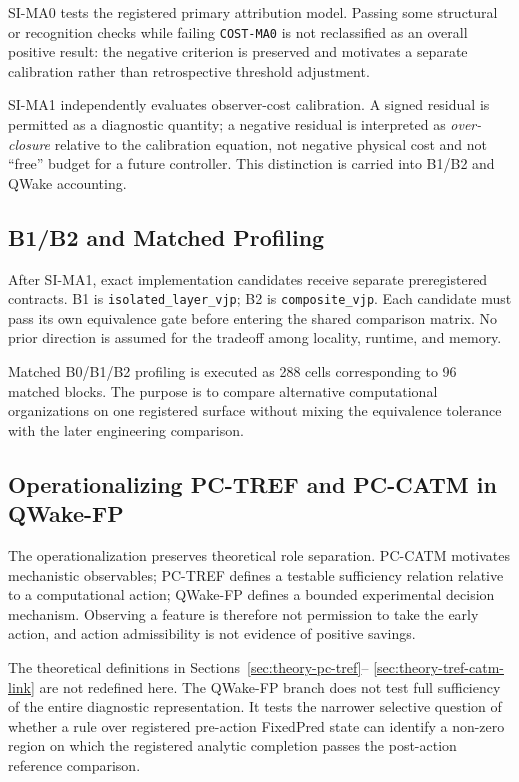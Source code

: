 SI-MA0 tests the registered primary attribution model. Passing some structural or
recognition checks while failing \texttt{COST-MA0} is not reclassified as an overall
positive result: the negative criterion is preserved and motivates a separate
calibration rather than retrospective threshold adjustment.

SI-MA1 independently evaluates observer-cost calibration. A signed residual is
permitted as a diagnostic quantity; a negative residual is interpreted as
\emph{over-closure} relative to the calibration equation, not negative physical cost
and not ``free'' budget for a future controller. This distinction is carried into
B1/B2 and QWake accounting.

\subsection{B1/B2 and Matched Profiling}

After SI-MA1, exact implementation candidates receive separate preregistered
contracts. B1 is \texttt{isolated\_layer\_vjp}; B2 is \texttt{composite\_vjp}. Each
candidate must pass its own equivalence gate before entering the shared comparison
matrix. No prior direction is assumed for the tradeoff among locality, runtime, and
memory.

Matched B0/B1/B2 profiling is executed as 288 cells corresponding to 96 matched
blocks. The purpose is to compare alternative computational organizations on one
registered surface without mixing the equivalence tolerance with the later engineering
comparison.

\subsection{Operationalizing PC-TREF and PC-CATM in QWake-FP}
\label{sec:method-task-relative-sufficiency-en}

The operationalization preserves theoretical role separation. PC-CATM motivates
mechanistic observables; PC-TREF defines a testable sufficiency relation relative to
a computational action; QWake-FP defines a bounded experimental decision mechanism.
Observing a feature is therefore not permission to take the early action, and action
admissibility is not evidence of positive savings.

The theoretical definitions in Sections~\ref{sec:theory-pc-tref}--
\ref{sec:theory-tref-catm-link} are not redefined here. The QWake-FP branch does not
test full sufficiency of the entire diagnostic representation. It tests the narrower
selective question of whether a rule over registered pre-action FixedPred state can
identify a non-zero region on which the registered analytic completion passes the
post-action reference comparison.

